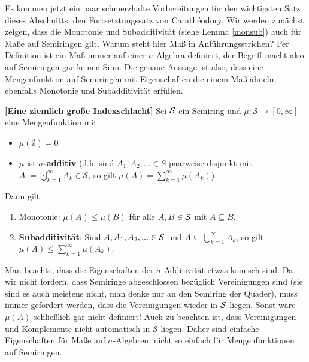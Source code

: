 Es kommen jetzt ein paar schmerzhafte Vorbereitungen f\"ur den wichtigsten Satz dieses Abschnitts, den Fortsetztungssatz von Carath\'eodory. Wir werden zun\"achst zeigen, dass die Monotonie und Subadditivit\"at (siehe Lemma \ref{monsub}) auch f\"ur \glqq Ma\ss e\grqq{} auf Semiringen gilt. Warum steht hier Ma\ss{} in Anf\"uhrungsstrichen? Per Definition ist ein Ma\ss{} immer auf einer $\sigma$-Algebra definiert, der Begriff macht also auf Semiringen gar keinen Sinn. Die genaue Aussage ist also, dass eine Mengenfunktion auf Semiringen mit Eigenschaften die einem Ma\ss{} \"ahneln, ebenfalls Monotonie und Subadditivit\"at erf\"ullen. 
\begin{lemma}\label{Rechenregeln} \textbf{[Eine ziemlich gro\ss e Indexschlacht]}
	Sei $\mathcal{S}$ ein Semiring und $\mu \! : \mathcal S \rightarrow [0, \infty] $ eine Mengenfunktion mit
	\begin{itemize}
		\item $\mu(\emptyset) = 0$
		\item $\mu$ ist \textbf{$\sigma$-additiv} (d.h. sind $A_1, A_2, ... \in S$ paarweise disjunkt mit $A:=\bigcupdot_{k=1}^\infty A_k\in \mathcal S$, so gilt $\mu(A)=\sum_{k=1}^\infty \mu(A_k)$).
	\end{itemize}
	Dann gilt
	\begin{enumerate}[label=(\roman*)]
		\item \label{MonotQuasiMass} Monotonie: $\mu(A) \leq \mu(B)$ für alle $A,B \in \mathcal{S}$ mit $ A \subseteq B$.
		\item  \glqq \textbf{Subadditivit\"at}\grqq: Sind $A,A_1,A_2,... \in \mathcal{S} $ und $A\subseteq \bigcup\limits_{k=1}^{\infty} A_k$, so gilt $ \mu(A) \leq \sum\limits_{k = 1}^{\infty} \mu(A_k).$
	\end{enumerate}
\end{lemma}
Man beachte, dass die Eigenschaften der $\sigma$-Additivit\"at etwas komisch sind. Da wir nicht fordern, dass Semiringe abgeschlossen bez\"uglich Vereinigungen sind (sie sind es auch meistens nicht, man denke nur an den Semiring der Quader), muss immer gefordert werden, dass die Vereinigungen wieder in $\mathcal{S}$ liegen. Sonst w\"are $\mu(A)$ schlie\ss lich gar nicht definiert! Auch zu beachten ist, dass Vereinigungen und Komplemente nicht automatisch in $\mathcal S$ liegen. Daher sind einfache Eigenschaften f\"ur Ma\ss e auf $\sigma$-Algebren, nicht so einfach f\"ur Mengenfunktionen auf Semiringen.


